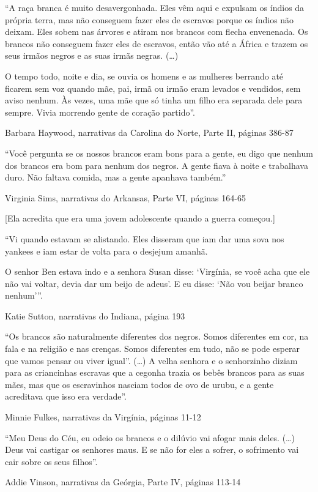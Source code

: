 ``A raça branca é muito desavergonhada. Eles vêm aqui e expulsam os
índios da própria terra, mas não conseguem fazer eles de escravos porque
os índios não deixam. Eles sobem nas árvores e atiram nos brancos com
flecha envenenada. Os brancos não conseguem fazer eles de escravos,
então vão até a África e trazem os seus irmãos negros e as suas irmãs
negras. (\ldots{})

O tempo todo, noite e dia, se ouvia os homens e as mulheres berrando até
ficarem sem voz quando mãe, pai, irmã ou irmão eram levados e vendidos,
sem aviso nenhum. Às vezes, uma mãe que só tinha um filho era separada
dele para sempre. Vivia morrendo gente de coração partido''.

Barbara Haywood, narrativas da Carolina do Norte, Parte II, páginas
386-87

``Você pergunta se os nossos brancos eram bons para a gente, eu digo que
nenhum dos brancos era bom para nenhum dos negros. A gente fiava à noite
e trabalhava duro. Não faltava comida, mas a gente apanhava também.''

Virginia Sims, narrativas do Arkansas, Parte VI, páginas 164-65

{[}Ela acredita que era uma jovem adolescente quando a guerra
começou.{]}

``Vi quando estavam se alistando. Eles disseram que iam dar uma sova nos
yankees e iam estar de volta para o desjejum amanhã.

O senhor Ben estava indo e a senhora Susan disse: `Virgínia, se você
acha que ele não vai voltar, devia dar um beijo de adeus'. E eu disse:
`Não vou beijar branco nenhum'''.

Katie Sutton, narrativas do Indiana, página 193

``Os brancos são naturalmente diferentes dos negros. Somos diferentes em
cor, na fala e na religião e nas crenças. Somos diferentes em tudo, não
se pode esperar que vamos pensar ou viver igual''. (\ldots{}) A velha
senhora e o senhorzinho diziam para as criancinhas escravas que a
cegonha trazia os bebês brancos para as suas mães, mas que os
escravinhos nasciam todos de ovo de urubu, e a gente acreditava que isso
era verdade''.

Minnie Fulkes, narrativas da Virgínia, páginas 11-12

``Meu Deus do Céu, eu odeio os brancos e o dilúvio vai afogar mais
deles. (\ldots{}) Deus vai castigar os senhores maus. E se não for eles
a sofrer, o sofrimento vai cair sobre os seus filhos''.

Addie Vinson, narrativas da Geórgia, Parte IV, páginas 113-14

